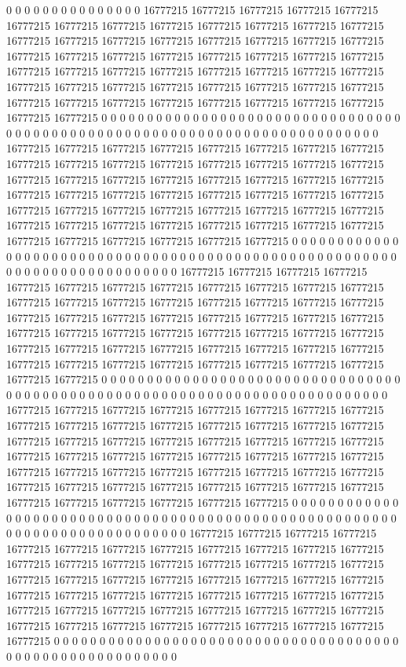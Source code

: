 0 0 0 0 0 0 0 0 0 0 0 0 0 0 0 16777215 16777215 16777215 16777215 16777215 16777215 16777215 16777215 16777215 16777215 16777215 16777215 16777215 16777215 16777215 16777215 16777215 16777215 16777215 16777215 16777215 16777215 16777215 16777215 16777215 16777215 16777215 16777215 16777215 16777215 16777215 16777215 16777215 16777215 16777215 16777215 16777215 16777215 16777215 16777215 16777215 16777215 16777215 16777215 16777215 16777215 16777215 16777215 16777215 16777215 16777215 16777215 16777215 16777215 16777215 0 0 0 0 0 0 0 0 0 0 0 0 0 0 0 0 0 0 0 0 0 0 0 0 0 0 0 0 0 0 0 0 0 0 0 0 0 0 0 0 0 0 0 0 0 0 0 0 0 0 0 0 0 0 0 0 0 0
0 0 0 0 0 0 0 0 0 0 0 0 0 0 0 0 16777215 16777215 16777215 16777215 16777215 16777215 16777215 16777215 16777215 16777215 16777215 16777215 16777215 16777215 16777215 16777215 16777215 16777215 16777215 16777215 16777215 16777215 16777215 16777215 16777215 16777215 16777215 16777215 16777215 16777215 16777215 16777215 16777215 16777215 16777215 16777215 16777215 16777215 16777215 16777215 16777215 16777215 16777215 16777215 16777215 16777215 16777215 16777215 16777215 16777215 16777215 16777215 16777215 16777215 0 0 0 0 0 0 0 0 0 0 0 0 0 0 0 0 0 0 0 0 0 0 0 0 0 0 0 0 0 0 0 0 0 0 0 0 0 0 0 0 0 0 0 0 0 0 0 0 0 0 0 0 0 0 0 0 0 0
0 0 0 0 0 0 0 0 0 0 0 0 0 0 0 0 16777215 16777215 16777215 16777215 16777215 16777215 16777215 16777215 16777215 16777215 16777215 16777215 16777215 16777215 16777215 16777215 16777215 16777215 16777215 16777215 16777215 16777215 16777215 16777215 16777215 16777215 16777215 16777215 16777215 16777215 16777215 16777215 16777215 16777215 16777215 16777215 16777215 16777215 16777215 16777215 16777215 16777215 16777215 16777215 16777215 16777215 16777215 16777215 16777215 16777215 16777215 16777215 16777215 16777215 0 0 0 0 0 0 0 0 0 0 0 0 0 0 0 0 0 0 0 0 0 0 0 0 0 0 0 0 0 0 0 0 0 0 0 0 0 0 0 0 0 0 0 0 0 0 0 0 0 0 0 0 0 0 0 0 0 0
0 0 0 0 0 0 0 0 0 0 0 0 0 0 0 0 0 16777215 16777215 16777215 16777215 16777215 16777215 16777215 16777215 16777215 16777215 16777215 16777215 16777215 16777215 16777215 16777215 16777215 16777215 16777215 16777215 16777215 16777215 16777215 16777215 16777215 16777215 16777215 16777215 16777215 16777215 16777215 16777215 16777215 16777215 16777215 16777215 16777215 16777215 16777215 16777215 16777215 16777215 16777215 16777215 16777215 16777215 16777215 16777215 16777215 16777215 16777215 16777215 16777215 16777215 0 0 0 0 0 0 0 0 0 0 0 0 0 0 0 0 0 0 0 0 0 0 0 0 0 0 0 0 0 0 0 0 0 0 0 0 0 0 0 0 0 0 0 0 0 0 0 0 0 0 0 0 0 0 0 0 0
0 0 0 0 0 0 0 0 0 0 0 0 0 0 0 0 0 0 16777215 16777215 16777215 16777215 16777215 16777215 16777215 16777215 16777215 16777215 16777215 16777215 16777215 16777215 16777215 16777215 16777215 16777215 16777215 16777215 16777215 16777215 16777215 16777215 16777215 16777215 16777215 16777215 16777215 16777215 16777215 16777215 16777215 16777215 16777215 16777215 16777215 16777215 16777215 16777215 16777215 16777215 16777215 16777215 16777215 16777215 16777215 16777215 16777215 16777215 16777215 16777215 16777215 0 0 0 0 0 0 0 0 0 0 0 0 0 0 0 0 0 0 0 0 0 0 0 0 0 0 0 0 0 0 0 0 0 0 0 0 0 0 0 0 0 0 0 0 0 0 0 0 0 0 0 0 0 0 0 0 0
